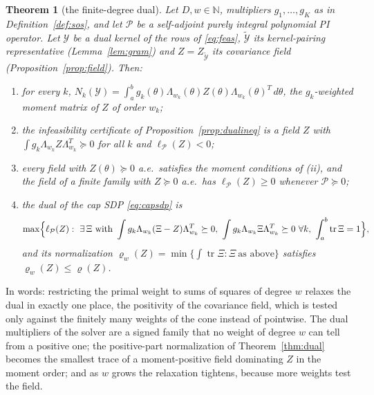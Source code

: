 \documentclass[12pt]{article}
\newcommand{\N}{\mathbb{N}}
\newcommand{\mcl}[1]{\mathcal{#1}}
\DeclareMathOperator{\tr}{tr}
\theoremstyle{plain}
\newtheorem{theorem}{Theorem}[section]
\theoremstyle{definition}
\theoremstyle{remark}
\begin{document}
\begin{theorem}[the finite-degree dual]\label{thm:map}
Let $D,w\in\N$, multipliers $g_1,\dots,g_K$ as in Definition~\ref{def:sos}, and let $\mcl P$ be a self-adjoint purely integral polynomial PI operator. Let $\mcl Y$ be a dual kernel of the rows of \eqref{eq:feas}, $\widetilde{\mcl Y}$ its kernel-pairing representative (Lemma~\ref{lem:gram}) and $Z=Z_{\widetilde{\mcl Y}}$ its covariance field (Proposition~\ref{prop:field}). Then:
\begin{enumerate}\setlength\itemsep{0pt}
\item[(i)] for every $k$, $N_k(\mcl Y)=\int_a^bg_k(\theta)\Lambda_{w_k}(\theta)Z(\theta)\Lambda_{w_k}(\theta)^T\,d\theta$, the $g_k$-weighted moment matrix of $Z$ of order $w_k$;
\item[(ii)] the infeasibility certificate of Proposition~\ref{prop:dualineq} is a field $Z$ with $\int g_k\Lambda_{w_k}Z\Lambda_{w_k}^T\succeq0$ for all $k$ and $\ell_{\mcl P}(Z)<0$;
\item[(iii)] every field with $Z(\theta)\succeq0$ a.e.\ satisfies the moment conditions of (ii), and the field of a finite family with $Z\succeq0$ a.e.\ has $\ell_{\mcl P}(Z)\ge0$ whenever $\mcl P\succeq0$;
\item[(iv)] the dual of the cap SDP \eqref{eq:capsdp} is
\[
\max\Bigl\{\ell_{\mcl P}(Z):\ \exists\,\Xi\ \text{with}\ \int g_k\Lambda_{w_k}(\Xi-Z)\Lambda_{w_k}^T\succeq0,\ \int g_k\Lambda_{w_k}\Xi\Lambda_{w_k}^T\succeq0\ \forall k,\ \int_a^b\tr\Xi=1\Bigr\},
\]
and its normalization $\varrho_{w}(Z)=\min\{\int\tr\Xi:\Xi\ \text{as above}\}$ satisfies $\varrho_w(Z)\le\varrho(Z)$.
\end{enumerate}
\end{theorem}
In words: restricting the primal weight to sums of squares of degree $w$ relaxes the dual in exactly one place, the positivity of the covariance field, which is tested only against the finitely many weights of the cone instead of pointwise. The dual multipliers of the solver are a signed family that no weight of degree $w$ can tell from a positive one; the positive-part normalization of Theorem~\ref{thm:dual} becomes the smallest trace of a moment-positive field dominating $Z$ in the moment order; and as $w$ grows the relaxation tightens, because more weights test the field.
\end{document}
